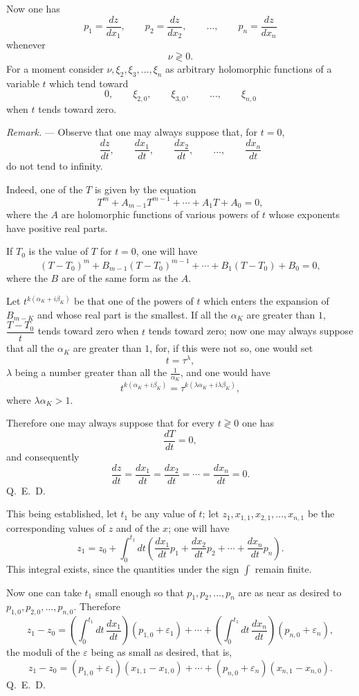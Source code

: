 \documentclass[11pt]{article}
\begin{document}
Now one has
\[
p_1=\frac{dz}{dx_1},
\qquad
p_2=\frac{dz}{dx_2},
\qquad \ldots,
\qquad
p_n=\frac{dz}{dx_n}
\]
whenever
\[
\nu\gtrless0.
\]
For a moment consider $\nu,\xi_2,\xi_3,\ldots,\xi_n$ as arbitrary holomorphic functions of a variable $t$ which tend toward
\[
0,\qquad \xi_{2,0},\qquad \xi_{3,0},\qquad \ldots,
\qquad \xi_{n,0}
\]
when $t$ tends toward zero.

\emph{Remark.} --- Observe that one may always suppose that, for $t=0$,
\[
\frac{dz}{dt},\qquad \frac{dx_1}{dt},\qquad \frac{dx_2}{dt},\qquad \ldots,
\qquad \frac{dx_n}{dt}
\]
do not tend to infinity.

Indeed, one of the $T$ is given by the equation
\begin{equation*}\tag{39}
T^m+A_{m-1}T^{m-1}+\cdots+A_1T+A_0=0,
\end{equation*}
where the $A$ are holomorphic functions of various powers of $t$ whose exponents have positive real parts.

If $T_0$ is the value of $T$ for $t=0$, one will have
\[
(T-T_0)^m+B_{m-1}(T-T_0)^{m-1}+\cdots+B_1(T-T_0)+B_0=0,
\]
where the $B$ are of the same form as the $A$.

Let $t^{k(\alpha_K+i\beta_K)}$ be that one of the powers of $t$ which enters the expansion of $B_{m-K}$ and whose real part is the smallest. If all the $\alpha_K$ are greater than $1$, $\dfrac{T-T_0}{t}$ tends toward zero when $t$ tends toward zero; now one may always suppose that all the $\alpha_K$ are greater than $1$, for, if this were not so, one would set
\[
t=\tau^\lambda,
\]
$\lambda$ being a number greater than all the $\frac1{\alpha_K}$, and one would have
\[
t^{k(\alpha_K+i\beta_K)}=\tau^{k(\lambda\alpha_K+i\lambda\beta_K)},
\]
where $\lambda\alpha_K>1$.

Therefore one may always suppose that for every $t\gtrless0$ one has
\[
\frac{dT}{dt}=0,
\]
and consequently
\[
\frac{dz}{dt}=\frac{dx_1}{dt}=\frac{dx_2}{dt}=\cdots=\frac{dx_n}{dt}=0.
\]
\hfill\mbox{Q. E. D.}

This being established, let $t_1$ be any value of $t$; let $z_1,x_{1,1},x_{2,1},\ldots,x_{n,1}$ be the corresponding values of $z$ and of the $x$; one will have
\[
z_1=z_0+\int_0^{t_1}dt\left(\frac{dx_1}{dt}p_1+\frac{dx_2}{dt}p_2+\cdots+\frac{dx_n}{dt}p_n\right).
\]
This integral exists, since the quantities under the sign $\int$ remain finite.

Now one can take $t_1$ small enough so that $p_1,p_2,\ldots,p_n$ are as near as desired to $p_{1,0},p_{2,0},\ldots,p_{n,0}$. Therefore
\[
z_1-z_0=\left(\int_0^{t_1}dt\,\frac{dx_1}{dt}\right)(p_{1,0}+\varepsilon_1)+\cdots+\left(\int_0^{t_1}dt\,\frac{dx_n}{dt}\right)(p_{n,0}+\varepsilon_n),
\]
the moduli of the $\varepsilon$ being as small as desired, that is,
\[
z_1-z_0=(p_{1,0}+\varepsilon_1)(x_{1,1}-x_{1,0})+\cdots+(p_{n,0}+\varepsilon_n)(x_{n,1}-x_{n,0}).
\]
\hfill\mbox{Q. E. D.}
\end{document}
